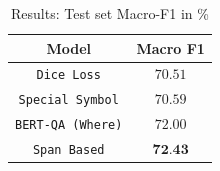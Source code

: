 
\begin{table}[h!]
\centering
\begin{tabular}{|c|c|}\hline
	\textbf{Model} & \textbf{Macro F1}\\\hline
	\texttt{Dice Loss} & $70.51$\\\hline
	\texttt{Special Symbol} & $70.59$\\\hline
	\texttt{BERT-QA (Where)} & $72.00$\\\hline
	\texttt{Span Based} & $\textbf{72.43}$\\\hline
	\end{tabular}
    \caption{Results: Test set Macro-F1 in \%}
    \label{tab:res_macro_f1}
\end{table}

